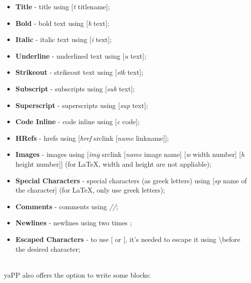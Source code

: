 \documentclass{article}
\begin{document}
\begin{itemize}
\item \textbf{Title} - title using [\textit{t} titlename];
\item \textbf{Bold} - bold text using [\textit{b} text];
\item \textbf{Italic} - italic text using [\textit{i} text];
\item \textbf{Underline} - underlined text using [\textit{u} text];
\item \textbf{Strikeout} - strikeout text using [\textit{stk} text];
\item \textbf{Subscript} - subscripts using [\textit{sub} text];
\item \textbf{Superscript} - superscripts using [\textit{sup} text];
\item \textbf{Code Inline} - code inline using [\textit{c} code];
\item \textbf{HRefs} - hrefs using [\textit{href} srclink [\textit{name} linkname]];
\item \textbf{Images} - images using [\textit{img} srclink [\textit{name} image name] [\textit{w} width number] [\textit{h} height number]] (for LaTeX, width and height are not appliable);
\item \textbf{Special Characters} - special characters (as greek letters) using [\textit{sp} name of the character] (for LaTeX, only use greek letters);
\item \textbf{Comments} - comments using \textit{//};
\item \textbf{Newlines} - newlines using two times \textbackslashn;
\item \textbf{Escaped Characters} - to use [ or ], it's needed to escape it using \textbackslash before the desired character;
\end{itemize}
\\
 yaPP also offers the option to write some blocks:
\end{document}
